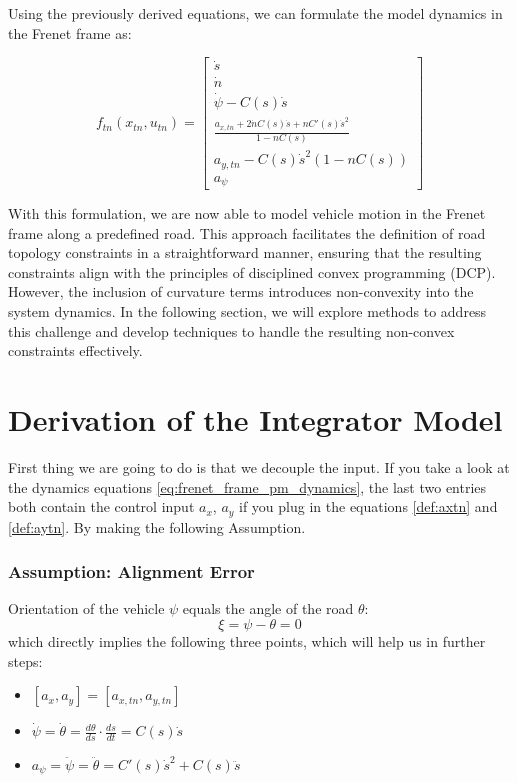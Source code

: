 Using the previously derived equations, we can formulate the model dynamics in the Frenet frame as:

\begin{equation}
	\label{eq:frenet_frame_pm_dynamics}
	f_{tn}(x_{tn}, u_{tn}) = \begin{bmatrix}
		\dot{s}                                   \\
		\dot{n}                                   \\
		\dot{\psi} - C(s)\dot{s}                  \\
		\frac{ a_{x,tn} + 2\dot{n}
		C(s)\dot{s}+nC'(s)\dot{s}^2 } { 1-nC(s) } \\ a_{y,tn} - C(s)\dot{s}^2(1-nC(s)) \\ a_\psi\end{bmatrix} \end{equation}

With this
formulation, we are now able to model vehicle motion in the Frenet frame along a predefined road.
This approach facilitates the definition of road topology constraints in a straightforward manner, ensuring that the resulting constraints align with
the principles of disciplined convex programming (DCP).
However, the inclusion of curvature terms introduces non-convexity into the system dynamics.
In the following section, we will explore methods to address this challenge and develop techniques to handle the resulting non-convex constraints
effectively.

\section{Derivation of the Integrator Model} \label{ch:der_int_mod}

First thing we are going to do is that we decouple the input.
If you take a look at the dynamics equations \ref{eq:frenet_frame_pm_dynamics}, the last two entries both contain the control input $a_x$, $a_y$ if
you plug in the equations \ref{def:axtn} and \ref{def:aytn}.
By making the following Assumption.
\subsubsection{Assumption: Alignment Error}

Orientation of the vehicle $\psi$ equals the angle of the road $\theta$:
\begin{equation}
	\xi = \psi - \theta = 0
\end{equation}
which directly implies the following three points, which will help us in further steps:
\begin{itemize}
	\item $[a_x, a_y] = [a_{x,tn}, a_{y,tn}]$
	\item $\dot{\psi} = \dot{\theta} = \frac{d\theta}{ds} \cdot \frac{ds}{dt} = C(s)\dot{s}$
	\item $a_\psi = \ddot{\psi} = \ddot{\theta} = C'(s) \dot{s}^2 + C(s)\ddot{s}$
\end{itemize}

